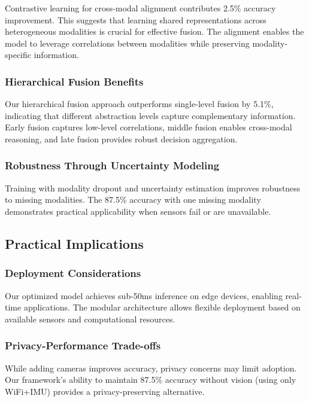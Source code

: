 \documentclass[journal]{IEEEtran}
\begin{document}
Contrastive learning for cross-modal alignment contributes 2.5\% accuracy improvement. This suggests that learning shared representations across heterogeneous modalities is crucial for effective fusion. The alignment enables the model to leverage correlations between modalities while preserving modality-specific information.

\subsubsection{Hierarchical Fusion Benefits}

Our hierarchical fusion approach outperforms single-level fusion by 5.1\%, indicating that different abstraction levels capture complementary information. Early fusion captures low-level correlations, middle fusion enables cross-modal reasoning, and late fusion provides robust decision aggregation.

\subsubsection{Robustness Through Uncertainty Modeling}

Training with modality dropout and uncertainty estimation improves robustness to missing modalities. The 87.5\% accuracy with one missing modality demonstrates practical applicability when sensors fail or are unavailable.

\subsection{Practical Implications}

\subsubsection{Deployment Considerations}

Our optimized model achieves sub-50ms inference on edge devices, enabling real-time applications. The modular architecture allows flexible deployment based on available sensors and computational resources.

\subsubsection{Privacy-Performance Trade-offs}

While adding cameras improves accuracy, privacy concerns may limit adoption. Our framework's ability to maintain 87.5\% accuracy without vision (using only WiFi+IMU) provides a privacy-preserving alternative.
\end{document}
